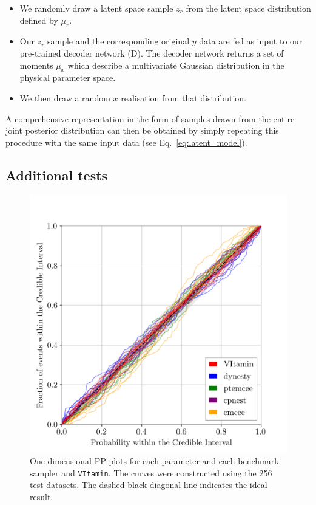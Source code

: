 \documentclass[%
showpacs,
 amsmath,amssymb,
 aps,
 twocolumn,
 prl,
 reprint,
floatfix,
]{revtex4-1}
\begin{document}
%
%
\begin{itemize}
%
\item We randomly draw a latent space sample $z_r$ from the latent space
distribution defined by $\mu_r$.
%
\item Our $z_r$ sample and the corresponding original $y$ data are fed as input to our
pre-trained decoder network (D). The decoder network returns a set of moments
$\mu_{x}$ which describe a multivariate Gaussian distribution in the physical
parameter space.
%
\item We then draw a random $x$ realisation from that distribution.
%
\end{itemize}
%

%
%
A comprehensive representation in the form of samples drawn from the entire joint
posterior distribution can then be obtained by simply repeating this procedure
with the same input data (see Eq.~\ref{eq:latent_model}).

%
%
\subsection{Additional tests}
%
%
\begin{figure}
    \includegraphics[width=\columnwidth]{latest_pp_plot.png}
    \caption{\label{fig:pp_plot} One-dimensional \ac{PP} plots for each
parameter and each benchmark sampler and \texttt{VItamin}.  The curves were
constructed using the 256 test datasets. The dashed black diagonal line
indicates the ideal result.
}
\end{figure}
%
\end{document}
